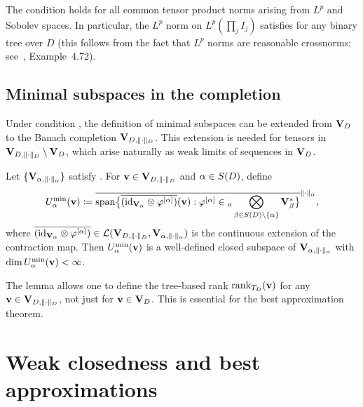 \begin{remark}
\label{rem:TD_inj_Lp}
The condition \condINJ[$T_D$] holds for all common tensor product
norms arising from $L^p$ and Sobolev spaces. In particular, the
$L^p$ norm on $L^p(\prod_j I_j)$ satisfies \condINJ[$T_D$] for
any binary tree over $D$ (this follows from the fact that $L^p$
norms are reasonable crossnorms; see~\cite{Hackbusch2019},
Example~4.72).
\end{remark}

\subsection*{Minimal subspaces in the completion}

Under condition \condINJ[$T_D$], the definition of minimal subspaces
can be extended from $\mathbf{V}_D$ to the Banach completion $\mathbf{V}_{D,\|\cdot\|_D}$. This
extension is needed for tensors in $\mathbf{V}_{D,\|\cdot\|_D} \setminus \mathbf{V}_D$, which
arise naturally as weak limits of sequences in $\mathbf{V}_D$.

\begin{lemma}
\label{lem:min_extension}
Let $\{\mathbf{V}_{\alpha,\|\cdot\|_\alpha}\}$ satisfy \condINJ[$T_D$]. For
$\mathbf{v} \in \mathbf{V}_{D,\|\cdot\|_D}$ and $\alpha \in S(D)$, define
\begin{equation}
\label{eq:min_extension}
    U^{\min}_{\alpha}(\mathbf{v})
    \coloneqq \overline{\mathrm{span}\bigl\{
        \overline{(\mathrm{id}_{\mathbf{V}_\alpha} \otimes \varphi^{[\alpha]})}(\mathbf{v}) :
        \varphi^{[\alpha]} \in
        {}_a\bigotimes_{\beta \in S(D) \setminus \{\alpha\}}
        \mathbf{V}_\beta^*
    \bigr\}}^{\|\cdot\|_\alpha},
\end{equation}
where $\overline{(\mathrm{id}_{\mathbf{V}_\alpha} \otimes \varphi^{[\alpha]})}
\in \mathcal{L}(\mathbf{V}_{D,\|\cdot\|_D}, \mathbf{V}_{\alpha,\|\cdot\|_\alpha})$ is the continuous extension of the
contraction map. Then $U^{\min}_{\alpha}(\mathbf{v})$ is a well-defined closed
subspace of $\mathbf{V}_{\alpha,\|\cdot\|_\alpha}$ with $\dim U^{\min}_{\alpha}(\mathbf{v}) < \infty$.
\end{lemma}

The lemma allows one to define the tree-based rank
$\mathrm{rank}_{T_D}(\mathbf{v})$ for any $\mathbf{v} \in \mathbf{V}_{D,\|\cdot\|_D}$, not just for
$\mathbf{v} \in \mathbf{V}_D$. This is essential for the best approximation theorem.

\section{Weak closedness and best approximations}
\label{sec:topTBT:bestapprox}

